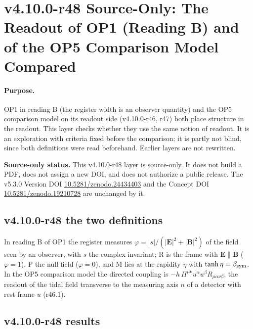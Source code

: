 \clearpage
\section*{v4.10.0-r48 Source-Only: The Readout of OP1 (Reading B) and of the OP5 Comparison Model Compared}
\label{sec:v4100-r48-readout-compare}

\paragraph{Purpose.}
OP1 in reading B (the register width is an observer quantity) and the OP5 comparison model on its readout side (v4.10.0-r46, r47) both place
structure in the readout.  This layer checks whether they use the same notion of readout.  It is an exploration with criteria fixed before the
comparison; it is partly not blind, since both definitions were read beforehand.  Earlier layers are not rewritten.

\noindent\textbf{Source-only status.}
This v4.10.0-r48 layer is source-only.  It does not build a PDF, does not assign a new DOI,
and does not authorize a public release.  The v5.3.0 Version DOI
\href{https://doi.org/10.5281/zenodo.24434403}{10.5281/zenodo.24434403} and the Concept DOI
\href{https://doi.org/10.5281/zenodo.19210728}{10.5281/zenodo.19210728} are unchanged by it.

\subsection*{v4.10.0-r48 the two definitions}
\label{subsec:v4100-r48-definitions}

In reading B of OP1 the register measures \(\varphi=|s|/(|\mathbf E|^2+|\mathbf B|^2)\) of the field seen by an observer, with \(s\) the complex invariant; R is the frame with
\(\mathbf E\parallel\mathbf B\) (\(\varphi=1\)), P the null field (\(\varphi=0\)), and M lies at the rapidity \(\eta\) with \(\tanh\eta=\beta_{\rm sym}\).  In the OP5 comparison model the directed
coupling is \(-h\,\Pi^{\mu\nu}u^\alpha u^\beta R_{\mu\alpha\nu\beta}\), the readout of the tidal field transverse to the measuring axis \(n\) of a detector with rest frame \(u\) (r46.1).

\subsection*{v4.10.0-r48 results}
\label{subsec:v4100-r48-results}

